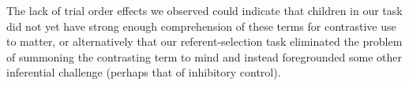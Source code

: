 \documentclass[man]{apa2}
\begin{document}
{ %
The lack of trial order effects we observed could indicate that children in our task did not yet have strong enough comprehension of these terms for contrastive use to matter, or alternatively that our referent-selection task eliminated the problem of summoning the contrasting term to mind and instead foregrounded some other inferential challenge (perhaps that of inhibitory control). 






}
\end{document}
